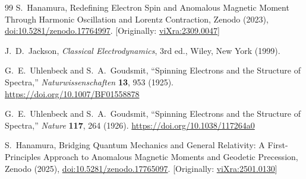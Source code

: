\documentclass[%
 reprint,
 amsmath,amssymb,
 aps,
]{revtex4-1}
\numberwithin{equation}{section}%
\begin{document}
\begin{thebibliography}{99}
S.~Hanamura, Redefining Electron Spin and Anomalous Magnetic Moment Through Harmonic Oscillation and Lorentz Contraction, Zenodo (2023), \href{https://doi.org/10.5281/zenodo.17764997}{doi:10.5281/zenodo.17764997}. [Originally: \href{https://vixra.org/abs/2309.0047}{viXra:2309.0047}]

J.~D.~Jackson, 
\textit{Classical Electrodynamics}, 3rd ed., 
Wiley, New York (1999).

G.~E.~Uhlenbeck and S.~A.~Goudsmit, 
``Spinning Electrons and the Structure of Spectra,'' 
\textit{Naturwissenschaften} \textbf{13}, 953 (1925).
\href{https://doi.org/10.1007/BF01558878}{https://doi.org/10.1007/BF01558878}

G.~E.~Uhlenbeck and S.~A.~Goudsmit, 
``Spinning Electrons and the Structure of Spectra,'' 
\textit{Nature} \textbf{117}, 264 (1926).
\href{https://doi.org/10.1038/117264a0}{https://doi.org/10.1038/117264a0}

S.~Hanamura, Bridging Quantum Mechanics and General Relativity: A First-Principles Approach to Anomalous Magnetic Moments and Geodetic Precession, Zenodo (2025), \href{https://doi.org/10.5281/zenodo.17765097}{doi:10.5281/zenodo.17765097}. [Originally: \href{https://vixra.org/abs/2501.0130}{viXra:2501.0130}]

\end{thebibliography}
\end{document}
